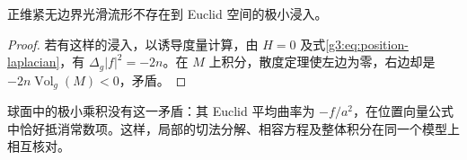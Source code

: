 \begin{corollary}\label{g3:cor:no-compact-euclidean-minimal}
	正维紧无边界光滑流形不存在到 Euclid 空间的极小浸入。
\end{corollary}
\begin{proof}
	若有这样的浸入，以诱导度量计算，由 \(H=0\) 及式\eqref{g3:eq:position-laplacian}，有 \(\Delta_g|f|^2=-2n\)。在 \(M\) 上积分，散度定理使左边为零，右边却是 \(-2n\operatorname{Vol}_g(M)<0\)，矛盾。
\end{proof}

球面中的极小乘积没有这一矛盾：其 Euclid 平均曲率为 \(-f/a^2\)，在位置向量公式中恰好抵消常数项。这样，局部的切法分解、相容方程及整体积分在同一个模型上相互核对。
